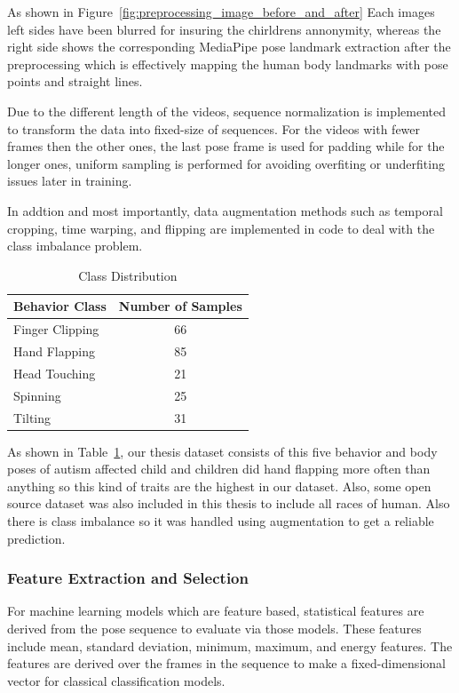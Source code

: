 As shown in Figure~\ref{fig:preprocessing_image_before_and_after} Each images left sides have been blurred for insuring the chirldrens annonymity, whereas the right side shows the corresponding MediaPipe pose landmark extraction after the preprocessing which is effectively mapping the human body landmarks with pose points and straight lines.

Due to the different length of the videos, sequence normalization is implemented to transform the data into fixed-size of sequences. For the videos with fewer frames then the other ones, the last pose frame is used for padding while for the longer ones, uniform sampling is performed for avoiding overfiting or underfiting issues later in training. 

In addtion and most importantly, data augmentation methods such as temporal cropping, time warping, and flipping are implemented in code to deal with the class imbalance problem.

\begin{table}[]
\centering
\caption{Class Distribution}
\label{tab:class_distribution}
\begin{tabular}{lc}
\toprule
\textbf{Behavior Class} & \textbf{Number of Samples} \\
\midrule
Finger Clipping   & 66\\
Hand Flapping     & 85 \\
Head Touching     & 21 \\
Spinning          & 25 \\
Tilting           & 31 \\
\midrule
\bottomrule
\end{tabular}
\end{table}

As shown in Table~\ref{tab:class_distribution}, our thesis dataset consists of this five behavior and body poses of autism affected child and children did hand flapping more often than anything so this kind of traits are the highest in our dataset. Also, some open source dataset was also included in this thesis to include all races of human. Also there is class imbalance so it was handled using augmentation to get a reliable prediction.




\subsubsection{Feature Extraction and Selection}

For machine learning models which are feature based, statistical features are derived from the pose sequence to evaluate via those models. These features include mean, standard deviation, minimum, maximum, and energy features. The features are derived over the frames in the sequence to make a fixed-dimensional vector for classical classification models.

